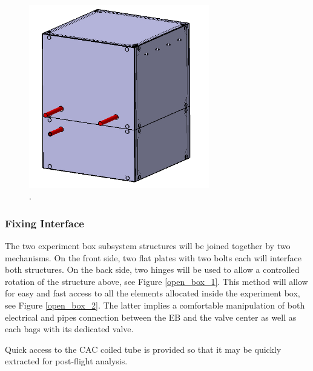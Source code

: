 \begin{figure}[!ht]
    \centering
    \includegraphics[width=0.7\textwidth]{4-experiment-design/img/frontal_holes.jpg}
    \caption{.}
    \label{front_wall_holes}
\end{figure}

\pagebreak
\subsubsection{Fixing Interface}

The two experiment box subsystem structures will be joined together by two mechanisms. On the front side, two flat plates with two bolts each will interface both structures. On the back side, two hinges will be used to allow a controlled rotation of the structure above, see Figure \ref{open_box_1}. This method will allow for easy and fast access to all the elements allocated inside the experiment box, see Figure \ref{open_box_2}. The latter implies a comfortable manipulation of both electrical and pipes connection between the EB and the valve center as well as each bags with its dedicated valve. 

Quick access to the CAC coiled tube is provided so that it may be quickly extracted for post-flight analysis.


